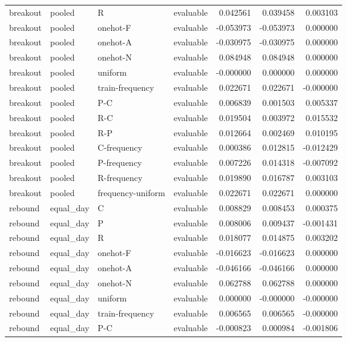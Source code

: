\begin{longtable}{llllrrr}
breakout & pooled & R & evaluable & 0.042561 & 0.039458 & 0.003103 \\
breakout & pooled & onehot-F & evaluable & -0.053973 & -0.053973 & 0.000000 \\
breakout & pooled & onehot-A & evaluable & -0.030975 & -0.030975 & 0.000000 \\
breakout & pooled & onehot-N & evaluable & 0.084948 & 0.084948 & 0.000000 \\
breakout & pooled & uniform & evaluable & -0.000000 & 0.000000 & 0.000000 \\
breakout & pooled & train-frequency & evaluable & 0.022671 & 0.022671 & -0.000000 \\
breakout & pooled & P-C & evaluable & 0.006839 & 0.001503 & 0.005337 \\
breakout & pooled & R-C & evaluable & 0.019504 & 0.003972 & 0.015532 \\
breakout & pooled & R-P & evaluable & 0.012664 & 0.002469 & 0.010195 \\
breakout & pooled & C-frequency & evaluable & 0.000386 & 0.012815 & -0.012429 \\
breakout & pooled & P-frequency & evaluable & 0.007226 & 0.014318 & -0.007092 \\
breakout & pooled & R-frequency & evaluable & 0.019890 & 0.016787 & 0.003103 \\
breakout & pooled & frequency-uniform & evaluable & 0.022671 & 0.022671 & 0.000000 \\
rebound & equal\_day & C & evaluable & 0.008829 & 0.008453 & 0.000375 \\
rebound & equal\_day & P & evaluable & 0.008006 & 0.009437 & -0.001431 \\
rebound & equal\_day & R & evaluable & 0.018077 & 0.014875 & 0.003202 \\
rebound & equal\_day & onehot-F & evaluable & -0.016623 & -0.016623 & 0.000000 \\
rebound & equal\_day & onehot-A & evaluable & -0.046166 & -0.046166 & 0.000000 \\
rebound & equal\_day & onehot-N & evaluable & 0.062788 & 0.062788 & 0.000000 \\
rebound & equal\_day & uniform & evaluable & 0.000000 & -0.000000 & -0.000000 \\
rebound & equal\_day & train-frequency & evaluable & 0.006565 & 0.006565 & -0.000000 \\
rebound & equal\_day & P-C & evaluable & -0.000823 & 0.000984 & -0.001806 \\

\end{longtable}
